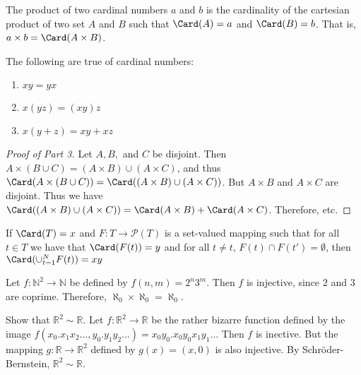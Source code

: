         \begin{definition}
            The product of two cardinal numbers $a$ and $b$
            is the cardinality of the cartesian product
            of two set $A$ and $B$ such that
            $\Card(A)=a$ and $\Card(B)=b$. That is,
            ${a}\times{b}=\Card({A}\times{B})$.
        \end{definition}
        \begin{theorem}
            The following are true of cardinal numbers:
            \begin{enumerate}
                \item $xy=yx$
                \item $x(yz)=(xy)z$
                \item $x(y+z)=xy+xz$
            \end{enumerate}
        \end{theorem}
        \begin{proof}[Proof of Part 3]
            Let $A,B,$ and $C$ be disjoint.
            Then
            ${A}\times{({B}\cup{C})}%
             =({A}\times{B})\cup({A}\times{C})$, and thus
            $\Card({A}\times{({B}\cup{C})})%
             =\Card(({A}\times{B})\cup({A}\times{C}))$.
            But ${A}\times{B}$ and ${A}\times{C}$ are disjoint.
            Thus we have
            $\Card(({A}\times{B})\cup({A}\times{C}))%
             =\Card({A}\times{B})+\Card({A}\times{C})$.
            Therefore, etc.
        \end{proof}
        \begin{theorem}
            If $\Card(T)=x$ and $F:{T}\rightarrow{\mathcal{P}(T)}$ is a
            set-valued mapping such that for all ${t}\in{T}$ we have that
            $\Card(F(t))=y$ and for all ${t}\ne{t}$,
            ${F(t)}\cap{F(t')}=\emptyset$, then $\Card(\cup_{t=1}^{N}F(t))=xy$
        \end{theorem}
        \begin{example}
            Let $f:{\mathbb{N}^{2}}\rightarrow{\mathbb{N}}$
            be defined by $f(n,m)=2^{n}3^{m}$.
            Then $f$ is injective, since $2$ and $3$
            are coprime. Therefore,
            $\aleph_{0}\times\aleph_{0}=\aleph_{0}$.
        \end{example}
        \begin{example}
            Show that $\mathbb{R}^{2}\sim\mathbb{R}$.
            Let $f:\mathbb{R}^{2}\rightarrow\mathbb{R}$
            be the rather bizarre function defined by the image
            $f(x_{0}.x_{1}x_{2}\hdots,y_{0}.y_{1}y_{2}\hdots)%
             =x_{0}y_{0}.x_{0}y_{0}x_{1}y_{1}\hdots$ Then
            $f$ is inective. But the mapping
            $g:\mathbb{R}\rightarrow\mathbb{R}^{2}$
            defined by $g(x)=(x,0)$ is also injective.
            By Schr\"{o}der-Bernstein,
            $\mathbb{R}^{2}\sim\mathbb{R}$.
        \end{example}
